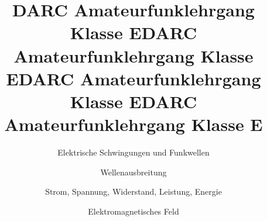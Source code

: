 \documentclass[aspectratio = 169]{beamer}
\begin{document}

\title{DARC Amateurfunklehrgang Klasse E}
\author{Elektrische Schwingungen und Funkwellen}
\begin{frame}
\maketitle
\end{frame}




\title{DARC Amateurfunklehrgang Klasse E}
\author{Wellenausbreitung}
\begin{frame}
\maketitle
\end{frame}













\title{DARC Amateurfunklehrgang Klasse E}
\author{Strom, Spannung, Widerstand, Leistung, Energie}
\begin{frame}
\maketitle
\end{frame}











\title{DARC Amateurfunklehrgang Klasse E}
\author{Elektromagnetisches Feld}
\begin{frame}
\maketitle
\end{frame}




\end{document}
